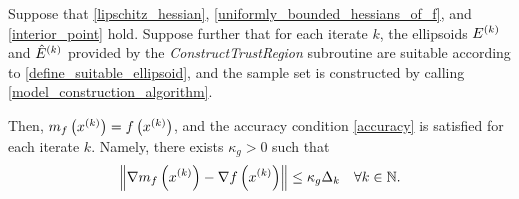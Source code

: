 \begin{theorem}
\label{linear_accuracy_is_satisfied}

Suppose that \cref{lipschitz_hessian}, \cref{uniformly_bounded_hessians_of_f}, and \cref{interior_point} hold.
Suppose further that for each iterate $k$, the ellipsoids ${E^{(k)}}$ and ${{\hat E}^{(k)}}$ provided by the \emph{ConstructTrustRegion} subroutine 
are suitable according to \cref{define_suitable_ellipsoid},
and the sample set is constructed by calling \cref{model_construction_algorithm}.



Then, $m_f\left(x^{(k)}\right) = f\left(x^{(k)}\right)$, and
the accuracy condition \cref{accuracy} is satisfied for each iterate $k$.
Namely, there exists $\kappa_{g} > 0$ such that 
\begin{align*}
\left\|\nabla m_f\left(x^{(k)}\right) - \nabla f\left(x^{(k)}\right)\right\| \le \kappa_g \Delta_k \quad \forall k \in \mathbb N.
\end{align*}
\end{theorem}

